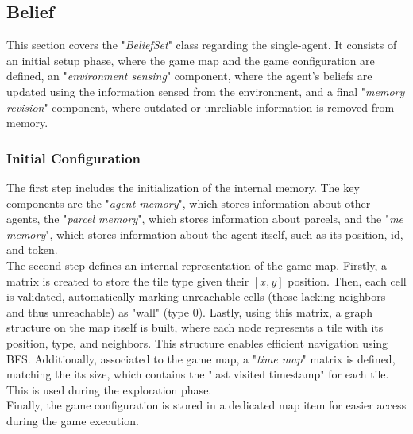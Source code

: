     \subsection{Belief}
        This section covers the "\textit{BeliefSet}" class regarding the single-agent. It consists of an initial setup phase, where the game map and the game configuration are defined, an "\textit{environment sensing}" component, where the agent's beliefs are updated using the information sensed from the environment, and a final "\textit{memory revision}" component, where outdated or unreliable information is removed from memory.

        \subsubsection{Initial Configuration}
            The first step includes the initialization of the internal memory. The key components are the "\textit{agent memory}", which stores information about other agents, the "\textit{parcel memory}", which stores information about parcels, and the "\textit{me memory}", which stores information about the agent itself, such as its position, id, and token.
            \medskip\\
            The second step defines an internal representation of the game map. Firstly, a matrix is created to store the tile type given their $[x, y]$ position. Then, each cell is validated, automatically marking unreachable cells (those lacking neighbors and thus unreachable) as "wall" (type $0$). Lastly, using this matrix, a graph structure on the map itself is built, where each node represents a tile with its position, type, and neighbors. This structure enables efficient navigation using BFS. Additionally, associated to the game map, a "\textit{time map}" matrix is defined, matching the its size, which contains the "last visited timestamp" for each tile. This is used during the exploration phase.
            \medskip\\
            Finally, the game configuration is stored in a dedicated map item for easier access during the game execution.

